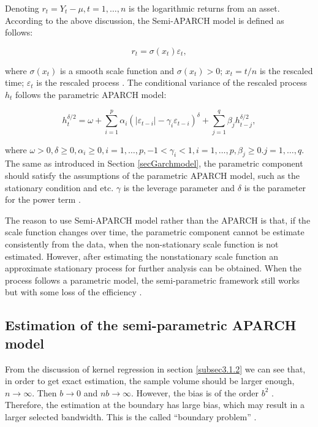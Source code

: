 Denoting $r_{t}= Y_t-\mu,t=1, \ldots,n$ is the logarithmic returns from an asset. According to the above discussion, the Semi-APARCH model is defined as follows:

\begin{equation}
r_{t} = \sigma(x_t)\varepsilon_{t},
\end{equation}

where $\sigma(x_t)$ is a smooth scale function and $\sigma(x_t) >0$; $x_t = t/n$ is the rescaled time; $\varepsilon_{t}$ is the rescaled process \citep{Feng2004}. The conditional variance of the rescaled process $h_{t}$ follows the parametric APARCH model:
  

\begin{equation}
h_{t}^{\delta/2} = \omega + \sum_{i=1}^{p} \alpha_{i}(|\varepsilon_{t-i}|-\gamma_{i}\varepsilon_{t-i})^{\delta} + \sum_{j=1}^{q}\beta_{j}h_{t-j}^{\delta/2},
\end{equation}

where $\omega>0, \delta\geq0, \alpha_{i}\geq0, i=1, \ldots, p, -1<\gamma_{i}<1, i=1, \ldots, p, \beta_{j}\geq0.j=1, \ldots, q$.
The same as introduced in Section \ref{secGarchmodel}, the parametric component should satisfy the assumptions of the parametric APARCH model, such as the stationary condition and etc. $\gamma$ is the leverage parameter and $\delta$ is the parameter for the power term \citep{Ding1993}.


The reason to use Semi-APARCH model rather than the APARCH is that, if the scale function changes over time, the parametric component cannot be estimate consistently from the data, when the non-stationary scale function is not estimated. However, after estimating the nonstationary scale function an approximate stationary process for further analysis can be obtained. When the process follows a parametric model, the semi-parametric framework still works but with some loss of the efficiency \citep{FengYuanhua;Sun2013}.

\subsection{ Estimation of the semi-parametric APARCH model}

From the discussion of kernel regression in section \ref{subsec3.1.2} we can see that, in order to get exact estimation, the sample volume should be larger enough, $n\longrightarrow\infty$. Then $b\longrightarrow0$ and $nb\longrightarrow\infty$. However, the bias is of the order $b^2$ . Therefore, the estimation at the boundary has large bias, which may result in a larger selected bandwidth. This is the called “boundary problem” \citep{Eubank1993}.


